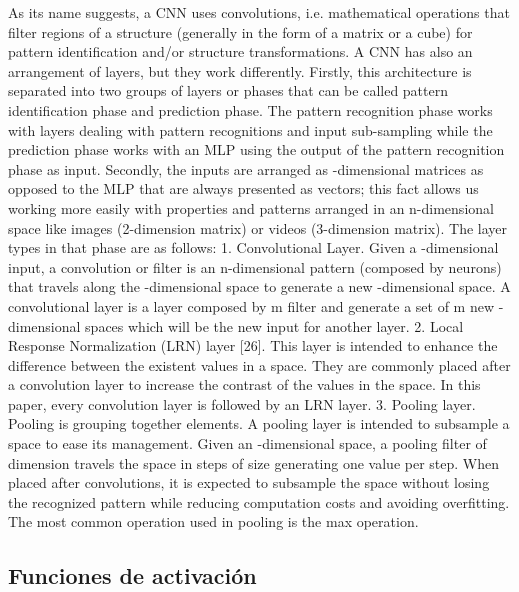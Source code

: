 As its name suggests, a CNN uses convolutions, i.e. mathematical operations that filter regions of a structure (generally in the form of a matrix or a cube) for pattern identification and/or structure transformations.
A CNN has also an arrangement of layers, but they work differently. Firstly, this architecture is separated into two groups of layers or phases that can be called pattern identification phase and prediction phase. The pattern recognition phase works with layers dealing with pattern recognitions and input sub-sampling while the prediction phase works with an MLP using the output of the pattern recognition phase as input. Secondly, the inputs are arranged as -dimensional matrices as opposed to the MLP that are always presented as vectors; this fact allows us working more easily with properties and patterns arranged in an n-dimensional space like images (2-dimension matrix) or videos (3-dimension matrix). The layer types in that phase are as follows:
1. Convolutional Layer. Given a -dimensional input, a convolution or filter is an n-dimensional pattern (composed by neurons) that travels along the -dimensional space to generate a new -dimensional space. A convolutional layer is a layer composed by m filter and generate a set of m new -dimensional spaces which will be the new input for another layer.
2. Local Response Normalization (LRN) layer [26]. This layer is intended to enhance the difference between the existent values in a space. They are commonly placed after a convolution layer to increase the contrast of the values in the space. In this paper, every convolution layer is followed by an LRN layer.
3. Pooling layer. Pooling is grouping together elements. A pooling layer is intended to subsample a space to ease its management. Given an -dimensional space, a pooling filter of dimension  travels the space in steps of size  generating one value per step. When placed after convolutions, it is expected to subsample the space without losing the recognized pattern while reducing computation costs and avoiding overfitting. The most common operation used in pooling is the max operation.

\subsection{Funciones de activación}

